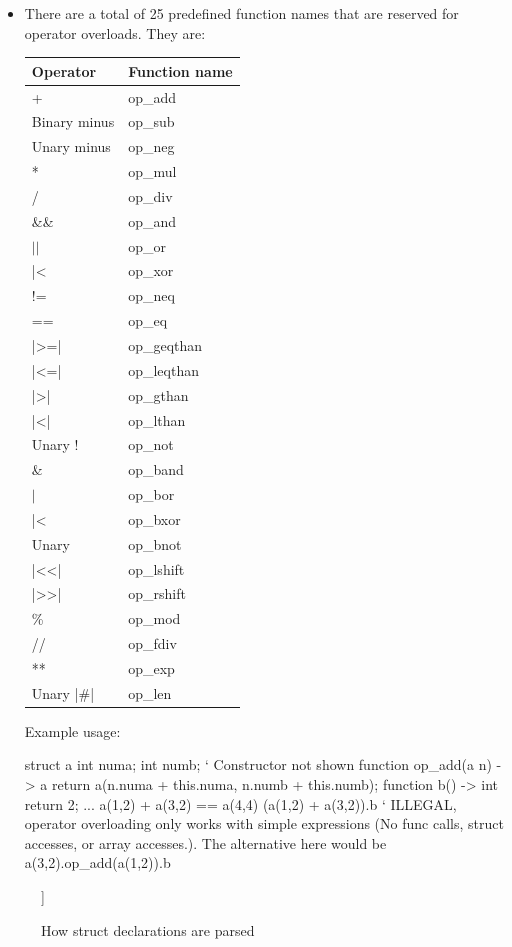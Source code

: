 \documentclass[12pt, letterpaper, oneside]{article}
\begin{document}
\begin{itemize}
		\label{misc:operatorOverloading}
		\item[--] There are a total of 25 predefined function names that are reserved for operator overloads. They are: \newline 
			\begin{tabular}{|p{3cm}|p{4cm}|}
			\hline
			Operator&Function name\\
			\hline
			+&op\_add\\
			\hline
			Binary minus&op\_sub\\
			\hline
			Unary minus&op\_neg\\
			\hline
			*&op\_mul\\
			\hline
			/&op\_div\\
			\hline
			\&\&&op\_and\\
			\hline
			$\vert\vert$&op\_or\\
			\hline
			\spverb|^^|&op\_xor\\
			\hline
			!=&op\_neq\\
			\hline
			==&op\_eq\\
			\hline
			\spverb|>=|&op\_geqthan\\
			\hline
			\spverb|<=|&op\_leqthan\\
			\hline
			\spverb|>|&op\_gthan\\
			\hline
			\spverb|<|&op\_lthan\\
			\hline
			Unary !&op\_not\\
			\hline
			\&&op\_band\\
			\hline
			$\vert$&op\_bor\\
			\hline
			\spverb|^^|&op\_bxor\\
			\hline
			Unary ~&op\_bnot\\
			\hline
			\spverb|<<|&op\_lshift\\
			\hline
			\spverb|>>|&op\_rshift\\
			\hline
			\%&op\_mod\\
			\hline
			//&op\_fdiv\\
			\hline
			**&op\_exp\\
			\hline
			Unary \spverb|#|&op\_len\\
			\hline
			\end{tabular} \newpage
			Example usage:
			\begin{spverbatim}
				struct a {
					int numa;
					int numb;
					` Constructor not shown
					function op_add(a n) -> a {
						return a(n.numa + this.numa, n.numb + this.numb);
					}
					function b() -> int {
						return 2;
					}
				}
				...
				a(1,2) + a(3,2) == a(4,4)
				(a(1,2) + a(3,2)).b ` ILLEGAL, operator overloading only works with simple expressions (No func calls, struct accesses, or array accesses.). The alternative here would be a(3,2).op_add(a(1,2)).b
			\end{spverbatim} 
	\end{itemize}
	\begin{figure}[h]
		\begin{forest}
			[STRUCT DECLARATION
			[child0: declaration of attribute 1]
			[child2: declaration of constructor()]
			]
		\end{forest}
		\caption{How struct declarations are parsed}
	\end{figure}
	
\end{document}
